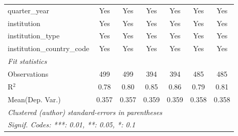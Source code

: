 \begin{tabular}{lcccccc}
   quarter\_year                      & Yes     & Yes     & Yes    & Yes     & Yes     & Yes\\  
   institution                        & Yes     & Yes     & Yes    & Yes     & Yes     & Yes\\  
   institution\_type                  & Yes     & Yes     & Yes    & Yes     & Yes     & Yes\\  
   institution\_country\_code         & Yes     & Yes     & Yes    & Yes     & Yes     & Yes\\  
   \midrule
   \emph{Fit statistics}\\
   Observations                       & 499     & 499     & 394    & 394     & 485     & 485\\  
   R$^2$                              & 0.78    & 0.80    & 0.85   & 0.86    & 0.79    & 0.81\\  
Mean(Dep. Var.) & 0.357 & 0.357 & 0.359 & 0.359 & 0.358 & 0.358 \\
   \midrule \midrule
   \multicolumn{7}{l}{\emph{Clustered (author) standard-errors in parentheses}}\\
   \multicolumn{7}{l}{\emph{Signif. Codes: ***: 0.01, **: 0.05, *: 0.1}}\\
\end{tabular}
\par\endgroup
